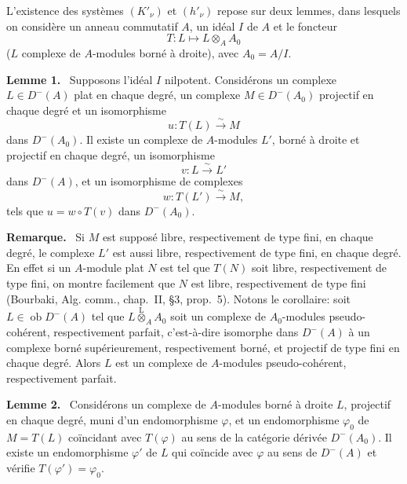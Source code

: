 \documentclass[11pt]{article}
\newenvironment{statement}[1]{\par\medskip\noindent\textbf{#1.}\ }{\par\medskip}
\providecommand{\lten}{\overset{\mathrm L}{\otimes}}
\providecommand{\Ob}{\operatorname{ob}}
\providecommand{\lten}{\overset{\mathrm L}{\otimes}}
\providecommand{\lten}{\overset{\mathrm L}{\otimes}}
\providecommand{\Ob}{\operatorname{ob}}
\providecommand{\lten}{\overset{\mathrm L}{\otimes}}
\providecommand{\lten}{\overset{\mathrm L}{\otimes}}
\providecommand{\Ob}{\operatorname{Ob}}
\providecommand{\lten}{\overset{\mathrm L}{\otimes}}
\providecommand{\Ob}{\operatorname{ob}}
\providecommand{\Ob}{\operatorname{Ob}}
\providecommand{\lten}{\overset{\mathrm L}{\otimes}}
\begin{document}
L'existence des systèmes $(K'_\nu)$ et $(h'_\nu)$ repose sur deux lemmes, dans lesquels on considère un anneau commutatif $A$, un idéal $I$ de $A$ et le foncteur
\[
T:L\longmapsto L\otimes_A A_0
\]
($L$ complexe de $A$-modules borné à droite), avec $A_0=A/I$.

\begin{statement}{Lemme 1}
Supposons l'idéal $I$ nilpotent. Considérons un complexe $L\in D^-(A)$ plat en chaque degré, un complexe $M\in D^-(A_0)$ projectif en chaque degré et un isomorphisme
\[
u:T(L)\xrightarrow{\sim}M
\]
dans $D^-(A_0)$. Il existe un complexe de $A$-modules $L'$, borné à droite et projectif en chaque degré, un isomorphisme
\[
v:L\xrightarrow{\sim}L'
\]
dans $D^-(A)$, et un isomorphisme de complexes
\[
w:T(L')\xrightarrow{\sim}M,
\]
tels que $u=w\circ T(v)$ dans $D^-(A_0)$.
\end{statement}

\begin{statement}{Remarque}
Si $M$ est supposé libre, respectivement de type fini, en chaque degré, le complexe $L'$ est aussi libre, respectivement de type fini, en chaque degré. En effet si un $A$-module plat $N$ est tel que $T(N)$ soit libre, respectivement de type fini, on montre facilement que $N$ est libre, respectivement de type fini (Bourbaki, Alg. comm., chap.~II, §3, prop.~5). Notons le corollaire: soit $L\in\Ob D^-(A)$ tel que $L\lten_A A_0$ soit un complexe de $A_0$-modules pseudo-cohérent, respectivement parfait, c'est-à-dire isomorphe dans $D^-(A)$ à un complexe borné supérieurement, respectivement borné, et projectif de type fini en chaque degré. Alors $L$ est un complexe de $A$-modules pseudo-cohérent, respectivement parfait.
\end{statement}

\begin{statement}{Lemme 2}
Considérons un complexe de $A$-modules borné à droite $L$, projectif en chaque degré, muni d'un endomorphisme $\varphi$, et un endomorphisme $\varphi_0$ de $M=T(L)$ coïncidant avec $T(\varphi)$ au sens de la catégorie dérivée $D^-(A_0)$. Il existe un endomorphisme $\varphi'$ de $L$ qui coïncide avec $\varphi$ au sens de $D^-(A)$ et vérifie $T(\varphi')=\varphi_0$.
\end{statement}
\end{document}
